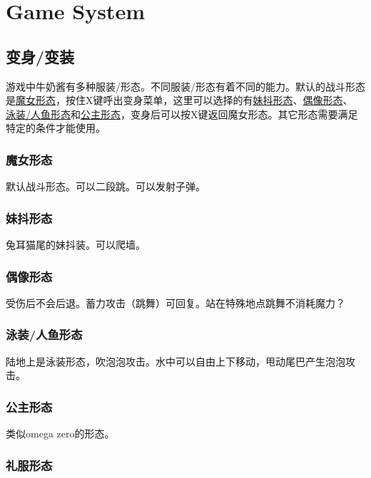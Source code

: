 \documentclass{article}
\begin{document}
\section{Game System}

\subsection{变身/变装}

游戏中牛奶酱有多种服装/形态。不同服装/形态有着不同的能力。默认的战斗形态是\hyperref[costume_majo]{魔女形态}，按住X键呼出变身菜单，这里可以选择的有\hyperref[costume_maid]{妹抖形态}、\hyperref[costume_idol]{偶像形态}、
\hyperref[costume_mermaid]{泳装/人鱼形态}和\hyperref[costume_hime]{公主形态}，变身后可以按X键返回魔女形态。其它形态需要满足特定的条件才能使用。

\subsubsection{魔女形态}
\label{costume_majo}

默认战斗形态。可以二段跳。可以发射子弹。

\subsubsection{妹抖形态}
\label{costume_maid}

兔耳猫尾的妹抖装。可以爬墙。

\subsubsection{偶像形态}
\label{costume_idol}

受伤后不会后退。蓄力攻击（跳舞）可回复。站在特殊地点跳舞不消耗魔力？

\subsubsection{泳装/人鱼形态}
\label{costume_mermaid}

陆地上是泳装形态，吹泡泡攻击。水中可以自由上下移动，甩动尾巴产生泡泡攻击。

\subsubsection{公主形态}
\label{costume_hime}

类似omega zero的形态。

\subsubsection{礼服形态}
\label{costume_dress}
\end{document}
